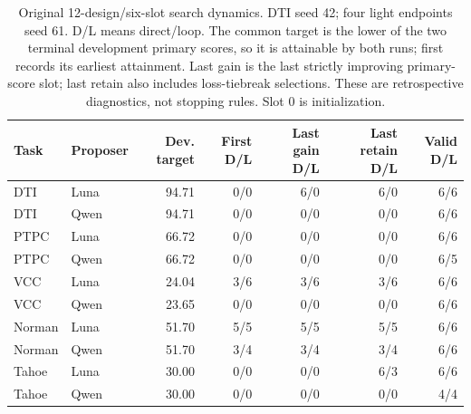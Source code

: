 \begin{table}[htbp]
\caption{Original 12-design/six-slot search dynamics. DTI seed 42; four light endpoints seed 61. D/L means direct/loop. The common target is the lower of the two terminal development primary scores, so it is attainable by both runs; first records its earliest attainment. Last gain is the last strictly improving primary-score slot; last retain also includes loss-tiebreak selections. These are retrospective diagnostics, not stopping rules. Slot 0 is initialization.}
\label{tab:completed-dynamics-short6}
\centering\small
\setlength{\tabcolsep}{4pt}
\begin{tabularx}{\linewidth}{@{}Xlrrrrr@{}}
\toprule
Task & Proposer & Dev. target & First D/L & Last gain D/L & Last retain D/L & Valid D/L \\
\midrule
DTI & Luna & 94.71 & 0/0 & 6/0 & 6/0 & 6/6 \\
DTI & Qwen & 94.71 & 0/0 & 0/0 & 0/0 & 6/6 \\
PTPC & Luna & 66.72 & 0/0 & 0/0 & 0/0 & 6/6 \\
PTPC & Qwen & 66.72 & 0/0 & 0/0 & 0/0 & 6/5 \\
VCC & Luna & 24.04 & 3/6 & 3/6 & 3/6 & 6/6 \\
VCC & Qwen & 23.65 & 0/0 & 0/0 & 0/0 & 6/6 \\
Norman & Luna & 51.70 & 5/5 & 5/5 & 5/5 & 6/6 \\
Norman & Qwen & 51.70 & 3/4 & 3/4 & 3/4 & 6/6 \\
Tahoe & Luna & 30.00 & 0/0 & 0/0 & 6/3 & 6/6 \\
Tahoe & Qwen & 30.00 & 0/0 & 0/0 & 0/0 & 4/4 \\
\bottomrule
\end{tabularx}
\end{table}
